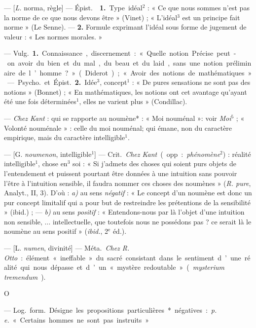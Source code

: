 \begin{itemize}[leftmargin=1cm, label=, itemsep=1pt]
 — [{\it L.} norma, règle] — \si{Épist.}  {\bf 1.}
Type idéal$^2$ : « Ce que nous sommes n’est pas la norme de ce que nous
devons être » (Vinet) ; « L'idéal$^3$ est un principe fait norme » (Le Senne).
—  {\bf 2.} Formule exprimant l'idéal sous forme de jugement
de valeur : « Les normes morales. »

 — \si{Vulg.} {\bf 1.} Connaissance, discernement : « Quelle
notion Précise peut-on avoir du bien et du mal, du beau et du laid, ... sans
une notion préliminaire de l’homme ? » (Diderot) ; « Avoir des notions de
mathématiques. »

— \si{Psycho.} et \si{Épist.} {\bf 2.} Idée$^3$, concept$^1$ : « De pures
sensations ne sont pas des notions » (Bonnet) ; « En mathématiques, les
notions ont cet avantage qu'ayant été une fois déterminées$^1$, elles ne
varient plus » (Condillac).

 — {\it Chez Kant} : qui se rapporte au noumène* : « Moi
nouménal »: voir {\it Moi}$^5$ ; « Volonté nouménale » : celle du moi
nouménal; qui émane, non du caractère empirique, mais du caractère
intelligible$^1$.

 — [G. {\it noumenon}, intelligible$^1$] — \si{Crit.} {\it Chez
Kant} (opp. : {\it phé\-nomène}$^2$) : réalité intelligible$^1$, chose
%
en$^3$ soi : « Si j’admets des choses qui soient purs objets de l’entendement
et puissent pourtant être données à une intuition sans pouvoir l'être à
l'intuition sensible, il faudra nommer ces choses des noumènes » ({\it R.
pure}, Analyt., II, 3). D'où : {\it a)} au sens {\it négatif} : « Le concept
d’un noumène est donc un pur concept limitalif qui a pour but de restreindre
les prétentions de la sensibilité » (ibid.) ; — {\it b)} au sens
{\it positif} : « Entendons-nous par là l’objet d’une intuition non
sensible, ... intellectuelle, que toutefois nous ne possédons pas ? ce serait
là le noumène au sens positif » ({\it ibid.}, 2$^\text{e}$ éd.).

 — [L. {\it numen}, divinité] — \si{Méta.} {\it Chez R. Otto} :
élément « ineffable » du sacré consistant dans le sentiment d’une réalité qui
nous dépasse et d’un « mystère redoutable » ({\it mysterium tremendum}).

\begin{center}
\huge{O}
\end{center}

 — \si{Log.} \si{form.} Désigne les propositions particulières*
négatives : {\it p. e.} « Certains hommes ne sont pas instruits. »


\end{itemize}
